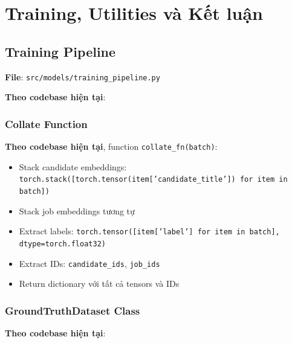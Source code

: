 \section{Training, Utilities và Kết luận}


\subsection{Training Pipeline}

\textbf{File}: \texttt{src/models/training\_pipeline.py}

\textbf{Theo codebase hiện tại}:

\subsubsection{Collate Function}

\textbf{Theo codebase hiện tại}, function \texttt{collate\_fn(batch)}:

\begin{itemize}
    \item Stack candidate embeddings: \texttt{torch.stack([torch.tensor(item['candidate\_title']) for item in batch])}
    \item Stack job embeddings tương tự
    \item Extract labels: \texttt{torch.tensor([item['label'] for item in batch], dtype=torch.float32)}
    \item Extract IDs: \texttt{candidate\_ids}, \texttt{job\_ids}
    \item Return dictionary với tất cả tensors và IDs
\end{itemize}

\subsubsection{GroundTruthDataset Class}

\textbf{Theo codebase hiện tại}:

